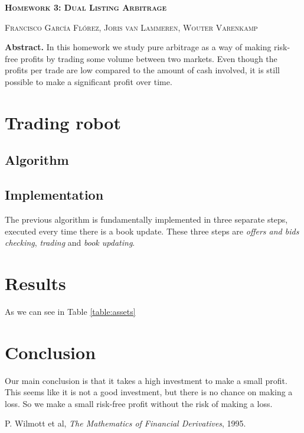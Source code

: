 \documentclass[8 pt]{article}
\begin{document}
\begin{minipage}{\textwidth}
    \centering
    \Large \textbf{\textsc{Homework 3: Dual Listing Arbitrage}}
    \vspace{0.5cm}

    \small \textsc{Francisco García Flórez, Joris van Lammeren, Wouter Varenkamp}
    \vspace{0.5cm}

    \begin{minipage}{0.6\textwidth}
      \textbf{Abstract.} In this homework we study pure arbitrage as a way of making risk-free profits by trading some volume between two markets. Even though the profits per trade are low compared to the amount of cash involved, it is still possible to make a significant profit over time.
    \end{minipage}
\end{minipage}

\vspace{0.5cm}

\begin{multicols*}{2}

\section{Trading robot}

\subsection{Algorithm}

\subsection{Implementation}

The previous algorithm is fundamentally implemented in three separate steps, executed every time there is a book update. These three steps are \emph{offers and bids checking}, \emph{trading} and \emph{book updating}.

\section{Results}

As we can see in Table \ref{table:assets}

\section{Conclusion}

Our main conclusion is that it takes a high investment to make a small profit. This seems like it is not a good investment, but there is no chance on making a loss. So we make a small risk-free profit without the risk of making a loss.

\begin{thebibliography}{28}
\raggedright
{}

 P. Wilmott et al, \emph{The Mathematics of Financial Derivatives}, 1995.

\end{thebibliography}

\end{multicols*}
\end{document}
